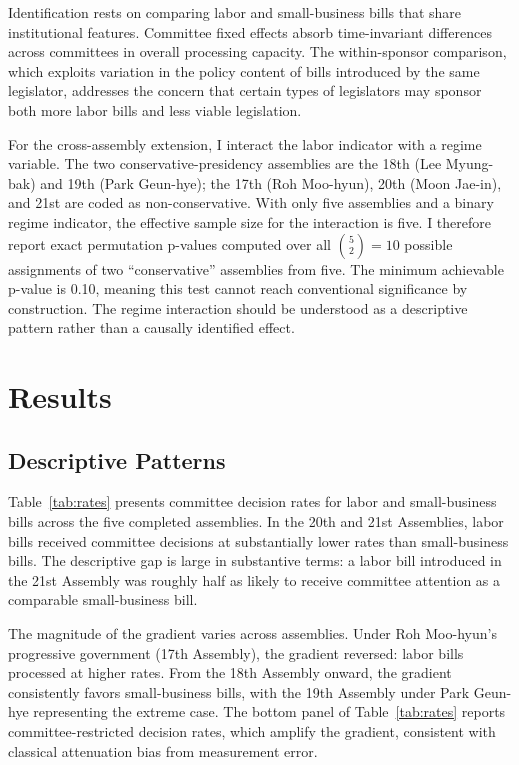 \documentclass[11pt]{article}
\begin{document}
Identification rests on comparing labor and small-business bills that share institutional features. Committee fixed effects absorb time-invariant differences across committees in overall processing capacity. The within-sponsor comparison, which exploits variation in the policy content of bills introduced by the same legislator, addresses the concern that certain types of legislators may sponsor both more labor bills and less viable legislation.

For the cross-assembly extension, I interact the labor indicator with a regime variable. The two conservative-presidency assemblies are the 18th (Lee Myung-bak) and 19th (Park Geun-hye); the 17th (Roh Moo-hyun), 20th (Moon Jae-in), and 21st are coded as non-conservative. With only five assemblies and a binary regime indicator, the effective sample size for the interaction is five. I therefore report exact permutation p-values computed over all $\binom{5}{2} = 10$ possible assignments of two ``conservative'' assemblies from five. The minimum achievable p-value is 0.10, meaning this test cannot reach conventional significance by construction. The regime interaction should be understood as a descriptive pattern rather than a causally identified effect.


\section{Results}
\label{sec:results}

\subsection{Descriptive Patterns}

Table~\ref{tab:rates} presents committee decision rates for labor and small-business bills across the five completed assemblies. In the 20th and 21st Assemblies, labor bills received committee decisions at substantially lower rates than small-business bills. The descriptive gap is large in substantive terms: a labor bill introduced in the 21st Assembly was roughly half as likely to receive committee attention as a comparable small-business bill.

The magnitude of the gradient varies across assemblies. Under Roh Moo-hyun's progressive government (17th Assembly), the gradient reversed: labor bills processed at higher rates. From the 18th Assembly onward, the gradient consistently favors small-business bills, with the 19th Assembly under Park Geun-hye representing the extreme case. The bottom panel of Table~\ref{tab:rates} reports committee-restricted decision rates, which amplify the gradient, consistent with classical attenuation bias from measurement error.
\end{document}
